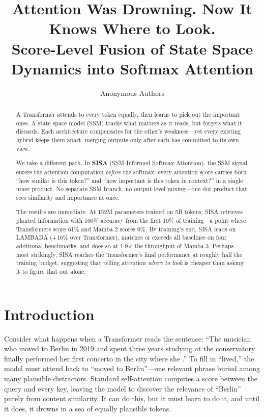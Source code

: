 \documentclass[11pt]{article}
\title{\Large \textbf{Attention Was Drowning. Now It Knows Where to Look.} \\[0.3em]
\large Score-Level Fusion of State Space Dynamics into Softmax Attention}
\author{Anonymous Authors}
\date{}
\begin{document}
\maketitle

\begin{abstract}
A Transformer attends to every token equally, then learns to pick out the important ones. A state space model (SSM) tracks what matters as it reads, but forgets what it discards. Each architecture compensates for the other's weakness---yet every existing hybrid keeps them apart, merging outputs only after each has committed to its own view.

We take a different path. In \textbf{SISA} (SSM-Informed Softmax Attention), the SSM signal enters the attention computation \emph{before} the softmax: every attention score carries both ``how similar is this token?'' and ``how important is this token in context?'' in a single inner product. No separate SSM branch, no output-level mixing---one dot product that sees similarity and importance at once.

The results are immediate. At 152M parameters trained on 5B tokens, SISA retrieves planted information with 100\% accuracy from the first 10\% of training---a point where Transformers score 61\% and Mamba-2 scores 0\%. By training's end, SISA leads on LAMBADA (+16\% over Transformer), matches or exceeds all baselines on four additional benchmarks, and does so at 1.9$\times$ the throughput of Mamba-3. Perhaps most strikingly, SISA reaches the Transformer's final performance at roughly half the training budget, suggesting that telling attention \emph{where to look} is cheaper than asking it to figure that out alone.
\end{abstract}

\section{Introduction}

Consider what happens when a Transformer reads the sentence: ``The musician who moved to Berlin in 2019 and spent three years studying at the conservatory finally performed her first concerto in the city where she \underline{\hspace{1cm}}.'' To fill in ``lived,'' the model must attend back to ``moved to Berlin''---one relevant phrase buried among many plausible distractors. Standard self-attention computes a score between the query and every key, leaving the model to discover the relevance of ``Berlin'' purely from content similarity. It can do this, but it must learn to do it, and until it does, it drowns in a sea of equally plausible tokens.
\end{document}
